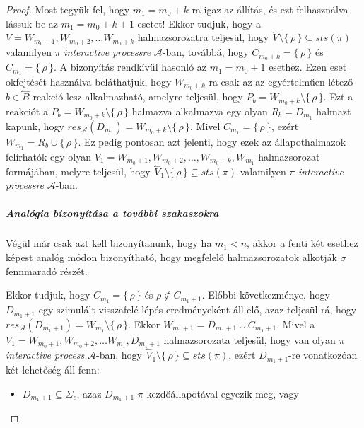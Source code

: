 \documentclass[12pt]{article}
\theoremstyle{definition}
\theoremstyle{remark}
\theoremstyle{plain}
\theoremstyle{plain}
\newcommand{\backwardhat}{\overset{\leftharpoonup}}
\newcommand{\res}{\textit{res}}
\begin{document}
\begin{proof}
        Most tegyük fel, hogy $m_{1} = m_{0} + k$-ra igaz az állítás, és ezt felhasználva lássuk be az $m_{1} = m_{0} + k + 1$ esetet! Ekkor tudjuk, hogy a $V = W_{m_{0} + 1}, W_{m_{0} + 2}, \ldots W_{m_{0} + k}$ halmazsorozatra teljesül, hogy $\backwardhat V \setminus \{ \, \rho \, \} \subseteq \textit{sts}(\pi)$ valamilyen $\pi$ \textit{interactive processre} $\mathscr{A}$-ban, továbbá, hogy $C_{m_{0} + k} = \{ \, \rho \, \}$ és $C_{m_{1}} = \{ \, \rho \,\}$. A bizonyítás rendkívül hasonló az $m_{1} = m_{0} + 1$ esethez. Ezen eset okfejtését használva beláthatjuk, hogy $W_{m_{0} + k}$-ra csak az az egyértelműen létező $b \in \backwardhat B$ reakció lesz alkalmazható, amelyre teljesül, hogy $P_{b} = W_{m_{0} + k} \setminus \{ \,  \rho \, \}$.  Ezt a reakciót a $P_{b} = W_{m_{0} + k} \setminus \{ \,  \rho \, \}$ halmazva alkalmazva egy olyan $R_{b} = D_{m_{1}}$ halmazt kapunk, hogy $\res_{\mathscr{A}}(D_{m_{1}}) = W_{m_{0} + k} \setminus \{ \,  \rho \, \}$. Mivel $C_{m_{1}} = \{\,\rho\,\}$, ezért $W_{m_{1}} = R_{b} \cup \{ \, \rho \, \}$. Ez pedig pontosan azt jelenti, hogy ezek az állapothalmazok felírhatók egy olyan $V_{1} = W_{m_{0} + 1}, W_{m_{0} + 2}, \ldots, W_{m_{0} + k}, W_{m_{1}}$ halmazsorozat formájában, melyre teljesül, hogy $\backwardhat V_{1} \setminus \{ \,  \rho \, \} \subseteq \textit{sts}(\pi)$ valamilyen $\pi$ \textit{interactive processre} $\mathscr{A}$-ban.

        \subparagraph{Analógia bizonyítása a további szakaszokra}
        Végül már csak azt kell bizonyítanunk, hogy ha $m_{1} < n$, akkor a fenti két esethez képest analóg módon bizonyítható, hogy megfelelő halmazsorozatok alkotják $\sigma$ fennmaradó részét. 

        Ekkor tudjuk, hogy $C_{m_{1}} = \{\,\rho\,\}$ és $\rho \notin C_{m_{1} + 1}$. Előbbi következménye, hogy $D_{m_{1} + 1}$ egy szimulált visszafelé lépés eredményeként áll elő, azaz teljesül rá, hogy $\res_{\mathscr{A}}(D_{m_{1} + 1}) = W_{m_{1}} \setminus \{\,\rho\,\}$. Ekkor $W_{m_{1} + 1} = D_{m_{1} + 1} \cup C_{m_{1} + 1}$. Mivel a $V_{1} = W_{m_{0} + 1}, W_{m_{0} + 2}, \ldots W_{m_{1}}, D_{m_{1} + 1}$ halmazsorozata teljesül, hogy van olyan $\pi$ \textit{interactive process} $\mathscr{A}$-ban, hogy $\backwardhat V_{1} \setminus \{\,\rho\,\} \subseteq \textit{sts}(\pi)$, ezért $D_{m_{1} + 1}$-re vonatkozóan két lehetőség áll fenn:
        \begin{itemize}
            \item
            $D_{m_{1} + 1} \subseteq \Sigma_{c}$, azaz $D_{m_{1} + 1}$ $\pi$ kezdőállapotával egyezik meg, vagy
        

\end{itemize}
\end{proof}
\end{document}
